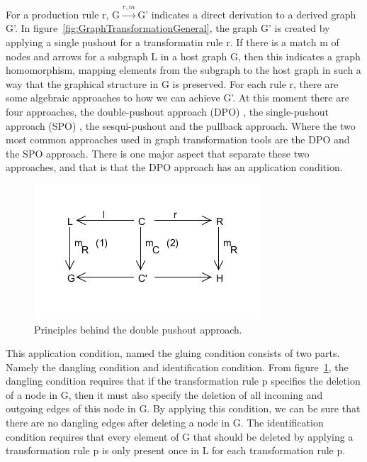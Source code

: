 For a production rule r, \mbox{G$\xrightarrow{r,m}$G'} indicates a direct
derivation to a derived graph G'. In
figure~\ref{fig:GraphTransformationGeneral}, the graph G' is created by
applying a single pushout for a transformatin rule r. If there is a match m of
nodes and arrows for a subgraph L in a host graph G, then this indicates a
graph homomorphism, mapping elements from the subgraph to the host graph in
such a way that the graphical structure in G is preserved. For each rule r,
there are some algebraic approaches to how we can achieve G'. At this moment
there are four approaches, the double-pushout approach (DPO) \cite{Loewe1997}, the
single-pushout approach (SPO) \cite{Ehrig1997}, the sesqui-pushout and the
pullback approach. Where the two most common approaches used in graph
transformation tools are the DPO and the SPO approach. There is one major
aspect that separate these two approaches, and that is that the DPO approach
has an application condition.

\begin{figure}[H]
	\centering
	\includegraphics[scale=0.7]{./Figures/Double_Pushout_Appr.png}
	\caption[The Double Pushout approach]
	{Principles behind the double pushout approach.}
	\label{fig:DPO}
\end{figure}

\noindent This application condition, named the gluing condition\cite{Loewe1997}
consists of two parts. Namely the dangling condition and identification
condition. From figure~\ref{fig:DPO}, the dangling condition requires that if
the transformation rule p specifies the deletion of a node in G, then it must also
specify the deletion of all incoming and outgoing edges of this node in G. By
applying this condition, we can be sure that there are no dangling edges after
deleting a node in G. The identification condition requires that every element
of G that should be deleted by applying a transformation rule p is only present
once in L for each transformation rule p. 

